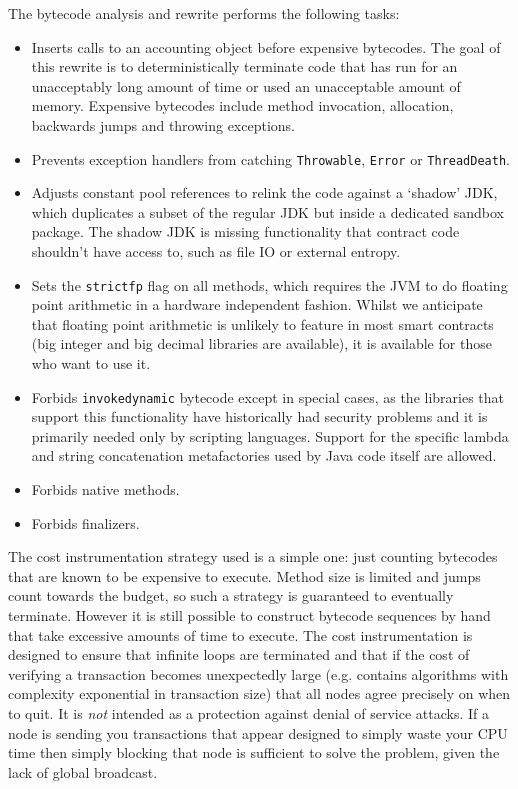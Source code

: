 \documentclass{article}
\begin{document}
The bytecode analysis and rewrite performs the following tasks:

\begin{itemize}
\item Inserts calls to an accounting object before expensive bytecodes. The goal of this rewrite is to deterministically
terminate code that has run for an unacceptably long amount of time or used an unacceptable amount of memory. Expensive
bytecodes include method invocation, allocation, backwards jumps and throwing exceptions.
\item Prevents exception handlers from catching \texttt{Throwable}, \texttt{Error} or \texttt{ThreadDeath}.
\item Adjusts constant pool references to relink the code against a `shadow' JDK, which duplicates a subset of the regular
JDK but inside a dedicated sandbox package. The shadow JDK is missing functionality that contract code shouldn't have access
to, such as file IO or external entropy.
\item Sets the \texttt{strictfp} flag on all methods, which requires the JVM to do floating point arithmetic in a hardware
independent fashion. Whilst we anticipate that floating point arithmetic is unlikely to feature in most smart contracts
(big integer and big decimal libraries are available), it is available for those who want to use it.
\item Forbids \texttt{invokedynamic} bytecode except in special cases, as the libraries that support this functionality have
historically had security problems and it is primarily needed only by scripting languages. Support for the specific
lambda and string concatenation metafactories used by Java code itself are allowed.
\item Forbids native methods.
\item Forbids finalizers.
\end{itemize}

The cost instrumentation strategy used is a simple one: just counting bytecodes that are known to be expensive to execute.
Method size is limited and jumps count towards the budget, so such a strategy is guaranteed to eventually terminate. However
it is still possible to construct bytecode sequences by hand that take excessive amounts of time to execute. The cost
instrumentation is designed to ensure that infinite loops are terminated and that if the cost of verifying a transaction
becomes unexpectedly large (e.g. contains algorithms with complexity exponential in transaction size) that all nodes agree
precisely on when to quit. It is \emph{not} intended as a protection against denial of service attacks. If a node is sending
you transactions that appear designed to simply waste your CPU time then simply blocking that node is sufficient to solve
the problem, given the lack of global broadcast.
\end{document}
